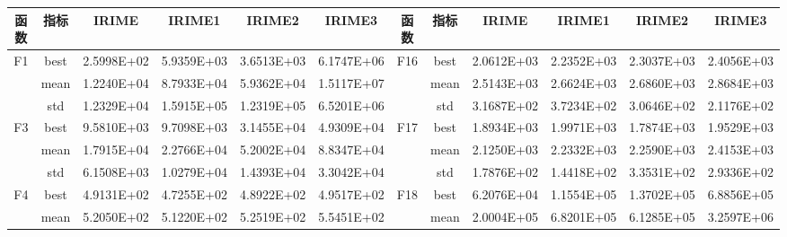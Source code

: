 \documentclass{wzuthesis}
\begin{document}
\begin{longtable}{ccccccccccc}
\end{longtable}%



\begin{table}[htbp]
  \centering
    \setlength{\tabcolsep}{3pt}
    \footnotesize
    \begin{tabular}{rrrrrrccrrrr}
    \toprule
    \multicolumn{1}{c}{函数} & \multicolumn{1}{c}{指标} & \multicolumn{1}{c}{IRIME} & \multicolumn{1}{c}{IRIME1} & \multicolumn{1}{c}{IRIME2} & \multicolumn{1}{c}{IRIME3} & 函数 & 指标 & \multicolumn{1}{c}{IRIME} & \multicolumn{1}{c}{IRIME1} & \multicolumn{1}{c}{IRIME2} & \multicolumn{1}{c}{IRIME3} \\
    \midrule
    \multicolumn{1}{c}{\multirow{3}[0]{*}{F1}} & \multicolumn{1}{c}{best} & 2.5998E+02 & 5.9359E+03 & 3.6513E+03 & 6.1747E+06 & \multirow{3}[0]{*}{F16} & best  & 2.0612E+03 & 2.2352E+03 & 2.3037E+03 & 2.4056E+03 \\
          & \multicolumn{1}{c}{mean} & 1.2240E+04 & 8.7933E+04 & 5.9362E+04 & 1.5117E+07 &       & mean  & 2.5143E+03 & 2.6624E+03 & 2.6860E+03 & 2.8684E+03 \\
          & \multicolumn{1}{c}{std} & 1.2329E+04 & 1.5915E+05 & 1.2319E+05 & 6.5201E+06 &       & std   & 3.1687E+02 & 3.7234E+02 & 3.0646E+02 & 2.1176E+02 \\
    \multicolumn{1}{c}{\multirow{3}[0]{*}{F3}} & \multicolumn{1}{c}{best} & 9.5810E+03 & 9.7098E+03 & 3.1455E+04 & 4.9309E+04 & \multirow{3}[0]{*}{F17} & best  & 1.8934E+03 & 1.9971E+03 & 1.7874E+03 & 1.9529E+03 \\
          & \multicolumn{1}{c}{mean} & 1.7915E+04 & 2.2766E+04 & 5.2002E+04 & 8.8347E+04 &       & mean  & 2.1250E+03 & 2.2332E+03 & 2.2590E+03 & 2.4153E+03 \\
          & \multicolumn{1}{c}{std} & 6.1508E+03 & 1.0279E+04 & 1.4393E+04 & 3.3042E+04 &       & std   & 1.7876E+02 & 1.4418E+02 & 3.3531E+02 & 2.9336E+02 \\
    \multicolumn{1}{c}{\multirow{3}[0]{*}{F4}} & \multicolumn{1}{c}{best} & 4.9131E+02 & 4.7255E+02 & 4.8922E+02 & 4.9517E+02 & \multirow{3}[0]{*}{F18} & best  & 6.2076E+04 & 1.1554E+05 & 1.3702E+05 & 6.8856E+05 \\
          & \multicolumn{1}{c}{mean} & 5.2050E+02 & 5.1220E+02 & 5.2519E+02 & 5.5451E+02 &       & mean  & 2.0004E+05 & 6.8201E+05 & 6.1285E+05 & 3.2597E+06 \\

\end{tabular}
\end{table}
\end{document}
